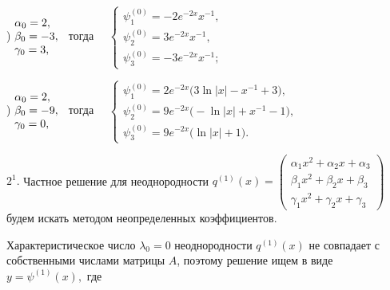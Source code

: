 \documentclass[11pt]{article}
\begin{document}
{) $\begin{matrix} \alpha_0 = 2,\hfill\\ \beta_0 = -3,\\ \gamma_0 = 3,\hfill \end{matrix}$ \ 
тогда \ \ $\begin{cases} 
\psi_1^{(0)}= -2e^{-2x} x^{-1},\\ \psi_2^{(0)}= 3e^{-2x} x^{-1},\\ \psi_3^{(0)}= -3e^{-2x} x^{-1}; \end{cases}$ 

) $\begin{matrix} \alpha_0 = 2,\hfill\\ \beta_0 = -9,\\ \gamma_0 = 0,\hfill \end{matrix}$ \ 
тогда \ \ $\begin{cases} 
\psi_1^{(0)} = 2e^{-2x} \big(3\ln |x| - x^{-1} + 3\big), \\
\psi_2^{(0)} = 9e^{-2x} \big(-\ln |x| + x^{-1} - 1\big), \\
\psi_3^{(0)} = 9e^{-2x} \big(\ln |x| + 1\big).
\end{cases}$


\smallskip
$2^1.$ Частное решение для неоднородности $q^{(1)}(x) = \begin{pmatrix} \alpha_1 x^2 + \alpha_2 x + \alpha_3 \\ \beta_1 x^2 + \beta_2 x + \beta_3 \\ \gamma_1 x^2 + \gamma_2 x + \gamma_3 \end{pmatrix}$ будем искать методом неопределенных коэффициентов. 

Характеристическое число $\lambda_0=0$ неоднородности $q^{(1)}(x)$ не совпадает с собственными числами матрицы $A$, 
поэтому решение ищем в виде $y=\psi^{(1)}(x),$ где

}
\end{document}
